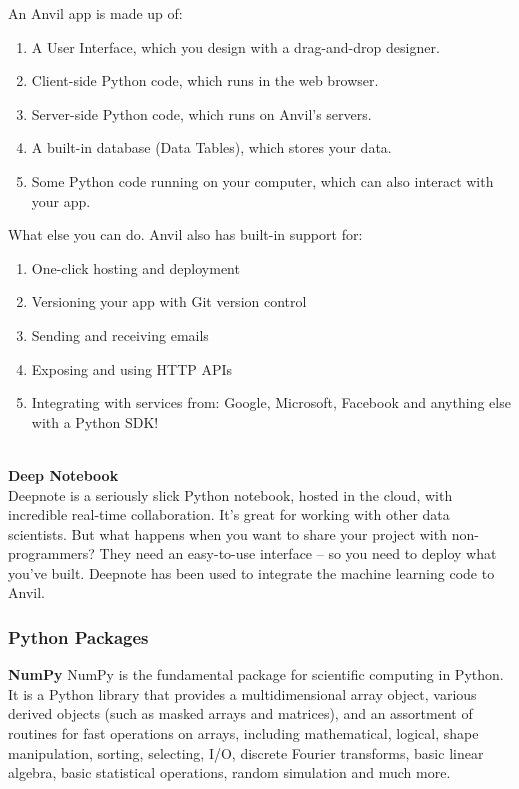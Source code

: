 \documentclass[12pt]{article}
\begin{document}
An Anvil app is made up of:
\begin{enumerate}
\item A User Interface, which you design with a drag-and-drop designer.
\item Client-side Python code, which runs in the web browser.
\item Server-side Python code, which runs on Anvil’s servers.
\item A built-in database (Data Tables), which stores your data.
\item Some Python code running on your computer, which can also interact with your app.
\end{enumerate}
What else you can do. Anvil also has built-in support for:
\begin{enumerate}
\item One-click hosting and deployment
\item Versioning your app with Git version control
\item Sending and receiving emails
\item Exposing and using HTTP APIs
\item Integrating with services from: Google, Microsoft, Facebook and anything else with a Python SDK!
\end{enumerate}
\\
\textbf{Deep Notebook}
\\
Deepnote is a seriously slick Python notebook, hosted in the cloud, with incredible real-time collaboration. It’s great for working with other data scientists. But what happens when you want to share your project with non-programmers? They need an easy-to-use interface – so you need to deploy what you’ve built. Deepnote has been used to integrate the machine learning code to Anvil.
\newpage
\subsubsection{Python Packages}
\textbf{NumPy}
NumPy is the fundamental package for scientific computing in Python. It is a Python library that provides a multidimensional array object, various derived objects (such as masked arrays and matrices), and an assortment of routines for fast operations on arrays, including mathematical, logical, shape manipulation, sorting, selecting, I/O, discrete Fourier transforms, basic linear algebra, basic statistical operations, random simulation and much more.
\end{document}
